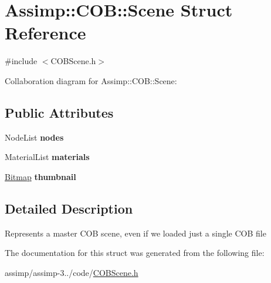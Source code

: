 \hypertarget{struct_assimp_1_1_c_o_b_1_1_scene}{\section{Assimp\+:\+:C\+O\+B\+:\+:Scene Struct Reference}
\label{struct_assimp_1_1_c_o_b_1_1_scene}
}


{\ttfamily \#include $<$C\+O\+B\+Scene.\+h$>$}



Collaboration diagram for Assimp\+:\+:C\+O\+B\+:\+:Scene\+:
\subsection*{Public Attributes}
\begin{DoxyCompactItemize}
\item 
\hypertarget{struct_assimp_1_1_c_o_b_1_1_scene_a727df3459ecf6f9485e52fa8cf55ec19}{Node\+List {\bfseries nodes}}\label{struct_assimp_1_1_c_o_b_1_1_scene_a727df3459ecf6f9485e52fa8cf55ec19}

\item 
\hypertarget{struct_assimp_1_1_c_o_b_1_1_scene_accf218aa2e5c39c5cd983310c20add68}{Material\+List {\bfseries materials}}\label{struct_assimp_1_1_c_o_b_1_1_scene_accf218aa2e5c39c5cd983310c20add68}

\item 
\hypertarget{struct_assimp_1_1_c_o_b_1_1_scene_a2cdaa89e07cf92f0fb29e882e700d594}{\hyperlink{struct_assimp_1_1_c_o_b_1_1_bitmap}{Bitmap} {\bfseries thumbnail}}\label{struct_assimp_1_1_c_o_b_1_1_scene_a2cdaa89e07cf92f0fb29e882e700d594}

\end{DoxyCompactItemize}


\subsection{Detailed Description}
Represents a master C\+O\+B scene, even if we loaded just a single C\+O\+B file 

The documentation for this struct was generated from the following file\+:\begin{DoxyCompactItemize}
\item 
assimp/assimp-\/3../code/\hyperlink{_c_o_b_scene_8h}{C\+O\+B\+Scene.\+h}\end{DoxyCompactItemize}
